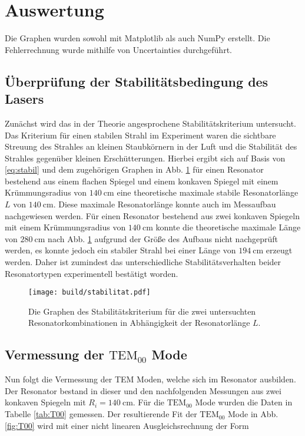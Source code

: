 \section{Auswertung}
\label{sec:Auswertung}
Die Graphen wurden sowohl mit Matplotlib \cite{matplotlib} als auch NumPy \cite{numpy} erstellt. Die
Fehlerrechnung wurde mithilfe von Uncertainties \cite{uncertainties} durchgeführt.

\subsection{Überprüfung der Stabilitätsbedingung des Lasers}
Zunächst wird das in der Theorie angesprochene Stabilitätskriterium untersucht. Das Kriterium für einen stabilen Strahl im Experiment waren die sichtbare Streuung des Strahles an kleinen Staubkörnern in der Luft und die Stabilität des Strahles gegenüber kleinen Erschütterungen.
Hierbei ergibt sich auf Basis von \ref{eq:stabil} und dem zugehörigen Graphen in Abb. \ref{fig:stabilitat} für einen Resonator bestehend aus einem flachen Spiegel und einem konkaven Spiegel mit einem Krümmungsradius von $\SI{140}{\centi\meter}$ eine theoretische maximale stabile Resonatorlänge $L$ von $\SI{140}{\centi\meter}$. Diese maximale Resonatorlänge konnte auch im Messaufbau nachgewiesen werden. Für einen Resonator bestehend aus zwei konkaven Spiegeln mit einem Krümmungsradius von $\SI{140}{\centi\meter}$ konnte die theoretische maximale Länge von $\SI{280}{\centi\meter}$ nach Abb. \ref{fig:stabilitat} aufgrund der Größe des Aufbaus nicht nachgeprüft werden, es konnte jedoch ein stabiler Strahl bei einer Länge von $\SI{194}{\centi\meter}$ erzeugt werden. Daher ist zumindest das unterschiedliche Stabilitätsverhalten beider Resonatortypen experimentell bestätigt worden.


\begin{figure}
	\centering
	\texttt{[image: build/stabilitat.pdf]}
	\caption{Die Graphen des Stabilitätskriterium für die zwei untersuchten Resonatorkombinationen in Abhängigkeit der Resonatorlänge $L$.}
	\label{fig:stabilitat}
\end{figure}




\subsection{Vermessung der $\text{TEM}_{00}$ Mode}
Nun folgt die Vermessung der TEM Moden, welche sich im Resonator ausbilden. Der Resonator bestand in dieser und den nachfolgenden Messungen aus zwei konkaven Spiegeln mit $R_i = \SI{140}{\centi\meter}$.
Für die $\text{TEM}_\text{00}$ Mode wurden die Daten in  Tabelle \ref{tab:T00} gemessen. Der resultierende Fit der $\text{TEM}_\text{00}$ Mode in Abb. \ref{fig:T00} wird mit einer nicht linearen Ausgleichsrechnung der Form

